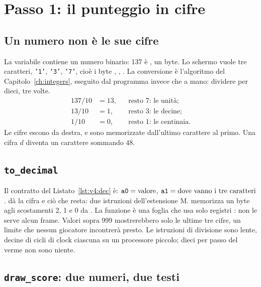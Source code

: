 \section{Passo 1: il punteggio in cifre}

\subsection{Un numero non è le sue cifre}

La variabile  contiene un numero binario: 137 è , un byte.
Lo schermo vuole tre caratteri, \texttt{'1'}, \texttt{'3'}, \texttt{'7'}, cioè
i byte , , . La conversione è l'algoritmo del
Capitolo~\ref{ch:integers}, eseguito dal programma invece che a mano: dividere
per dieci, tre volte.
\begin{align*}
137 / 10 &= 13, &&\text{resto 7: le unità;}\\
13 / 10 &= 1, &&\text{resto 3: le decine;}\\
1 / 10 &= 0, &&\text{resto 1: le centinaia.}
\end{align*}
Le cifre escono da destra, e sono memorizzate dall'ultimo carattere al primo.
Una cifra $d$ diventa un carattere sommando 48.

\subsection{\texttt{to\_decimal}}


Il contratto del Listato~\ref{lst:v4:dec} è: $\texttt{a0}=\text{valore}$,
$\texttt{a1}=\text{dove vanno i tre caratteri}$.  dà la cifra e
 ciò che resta: due istruzioni dell'estensione M.  memorizza
un byte agli scostamenti 2, 1 e 0 da . La funzione è una foglia che
usa solo registri : non le serve alcun frame. Valori sopra 999
mostrerebbero solo le ultime tre cifre, un limite che nessun giocatore
incontrerà presto. Le istruzioni di divisione sono lente, decine di cicli di
clock ciascuna su un processore piccolo; dieci per passo del verme non sono
niente.

\subsection{\texttt{draw\_score}: due numeri, due testi}

